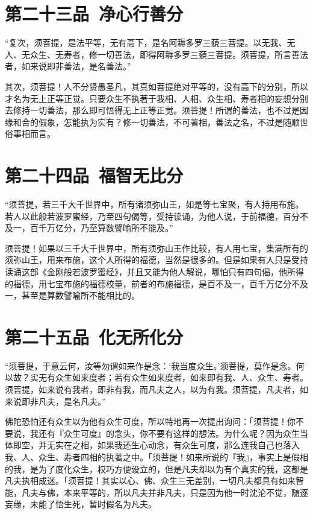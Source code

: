 \documentclass[12pt,twoside,openany]{book}
\newcommand{\kai}[1]{{\CJKfamily{kai}#1}}
\begin{document}
\chapter{第二十三品\ 净心行善分}
\begin{pinyinscope}
“复次，须菩提，是法平等，无有高下，是名阿耨多罗三藐三菩提。以无我、无人、无众生、无寿者，修一切善法，即得阿耨多罗三藐三菩提。须菩提，所言善法者，如来说即非善法，是名善法。”
\end{pinyinscope}

\kai{其次，须菩提！人不分贤愚圣凡，其真如菩提绝对平等的，没有高下的分别，所以才名为无上正等正觉。只要众生不执著于我相、人相、众生相、寿者相的妄想分别去修持一切善法，那么即可悟得无上正等正觉。须菩提！所谓的善法，也不过是因缘和合的假象，怎能执为实有？修一切善法，不可著相，善法之名，不过是随顺世俗事相而言。}

\chapter{第二十四品\ 福智无比分}
\begin{pinyinscope}
“须菩提，若三千大千世界中，所有诸须弥山王，如是等七宝聚，有人持用布施。若人以此般若波罗蜜经，乃至四句偈等，受持读诵，为他人说，于前福德，百分不及一，百千万亿分，乃至算数譬喻所不能及。”
\end{pinyinscope}

\kai{须菩提！如果以三千大千世界中，所有须弥山王作比较，有人用七宝，集满所有的须弥山王，用来布施，这个人所得的福德，当然是很多的。但是如果有人只是受持读诵这部《金刚般若波罗蜜经》，并且又能为他人解说，哪怕只有四句偈，他所得的福德，用七宝布施的福德校量，前者的布施福德，是百不及一，百千万亿分不及一，甚至是算数譬喻所不能相比的。}

\chapter{第二十五品\ 化无所化分}
\begin{pinyinscope}
“须菩提，于意云何，汝等勿谓如来作是念：‘我当度众生。’须菩提，莫作是念。何以故？实无有众生如来度者；若有众生如来度者，如来即有我、人、众生、寿者。须菩提，如来说有我者，即非有我，而凡夫之人，以为有我。须菩提，凡夫者，如来说即非凡夫，是名凡夫。”
\end{pinyinscope}

\kai{佛陀恐怕还有众生以为他有众生可度，所以特地再一次提出询问：「须菩提！你不要说，我还有『众生可度』的念头，你不要有这样的想法。为什么呢？因为众生当体即空，并无实在之相，如果我还生心动念，有众生可度，那么连我自己也落入我、人、众生、寿者四相的执著之中。「须菩提！如来所说的『我』，事实上是假相的我，是为了度化众生，权巧方便设立的，但是凡夫却以为有个真实的我，这都是凡夫执相成迷。「须菩提！其实以心、佛、众生三无差别，一切凡夫都具有如来智能，凡夫与佛，本来平等的，所以凡夫并非凡夫，只是因为他一时沈沦不觉，随逐妄缘，未能了悟生死，暂时假名为凡夫。}
\end{document}
